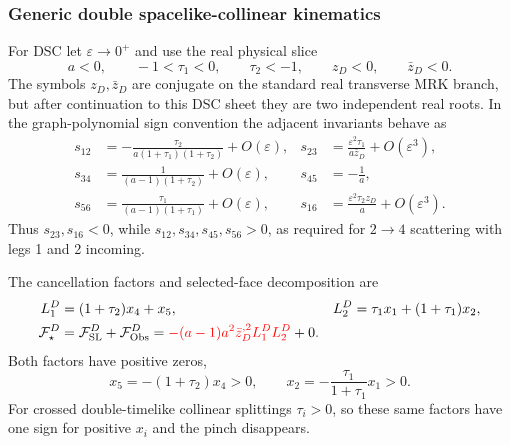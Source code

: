 \documentclass[a4paper,11pt]{article}
\newcommand{\FSL}{\mathcal F_{\rm SL}}
\newcommand{\FObs}{\mathcal F_{\rm Obs}}
\newcommand{\SLcolour}[1]{{\color{red}#1}}
\begin{document}
\subsubsection{Generic double spacelike-collinear kinematics}

For DSC let \(\varepsilon\to0^+\) and use the real physical slice
\begin{equation}
 a<0,\qquad -1<\tau_1<0,\qquad \tau_2<-1,\qquad
 z_D<0,\qquad \bar z_D<0.
 \label{eq:dsc-domain-example}
\end{equation}
The symbols \(z_D,\bar z_D\) are conjugate on the standard real transverse
MRK branch, but after continuation to this DSC sheet they are two independent
real roots.  In the graph-polynomial sign convention the adjacent invariants
behave as
\begin{align}
 s_{12}&=-\frac{\tau_2}{a(1+\tau_1)(1+\tau_2)}+O(\varepsilon),&
 s_{23}&=\frac{\varepsilon^2\tau_1}{a\bar z_D}+O(\varepsilon^3),\nonumber\\
 s_{34}&=\frac{1}{(a-1)(1+\tau_2)}+O(\varepsilon),&
 s_{45}&=-\frac1a,\nonumber\\
 s_{56}&=\frac{\tau_1}{(a-1)(1+\tau_1)}+O(\varepsilon),&
 s_{16}&=\frac{\varepsilon^2\tau_2z_D}{a}+O(\varepsilon^3).
 \label{eq:dsc-invariants-example}
\end{align}
Thus \(s_{23},s_{16}<0\), while \(s_{12},s_{34},s_{45},s_{56}>0\), as
required for \(2\to4\) scattering with legs 1 and 2 incoming.

The cancellation factors and selected-face decomposition are
\begin{align}
 L_1^D&=(1+\tau_2)x_4+x_5,&
 L_2^D&=\tau_1x_1+(1+\tau_1)x_2,
 \label{eq:dsc-factors-example}\\
 \mathcal F_\star^D&=\FSL^D+\FObs^D
 =\SLcolour{-(a-1)a^2\bar z_D^{,2}L_1^DL_2^D}+0.
 \label{eq:dsc-decomposition-example}
\end{align}
Both factors have positive zeros,
\begin{equation}
 x_5=-(1+\tau_2)x_4>0,\qquad
 x_2=-\frac{\tau_1}{1+\tau_1}x_1>0.
 \label{eq:dsc-positive-pinch-example}
\end{equation}
For crossed double-timelike collinear splittings \(\tau_i>0\), so these
same factors have one sign for positive \(x_i\) and the pinch disappears.
\end{document}
